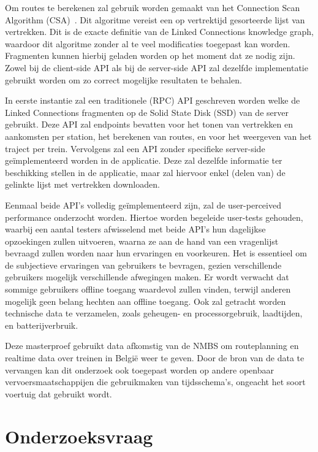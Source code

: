 Om routes te berekenen zal gebruik worden gemaakt van het Connection Scan Algorithm (CSA)~\citep{strasser13,strasser14,strasser17}. Dit algoritme vereist een op vertrektijd gesorteerde lijst van vertrekken. Dit is de exacte definitie van de Linked Connections knowledge graph, waardoor dit algoritme zonder al te veel modificaties toegepast kan worden. Fragmenten kunnen hierbij geladen worden op het moment dat ze nodig zijn. Zowel bij de client-side API als bij de server-side API zal dezelfde implementatie gebruikt worden om zo correct mogelijke resultaten te behalen. 

In eerste instantie zal een traditionele (RPC) API geschreven worden welke de Linked Connections fragmenten op de Solid State Disk (SSD) van de server gebruikt. Deze API zal endpoints bevatten voor het tonen van vertrekken en aankomsten per station, het berekenen van routes, en voor het weergeven van het traject per trein. 
Vervolgens zal een API zonder specifieke server-side geïmplementeerd worden in de applicatie. Deze zal dezelfde informatie ter beschikking stellen in de applicatie, maar zal hiervoor enkel (delen van) de gelinkte lijst met vertrekken downloaden. 

Eenmaal beide API's volledig geïmplementeerd zijn, zal de user-perceived performance onderzocht worden. Hiertoe worden begeleide user-tests gehouden, waarbij een aantal testers afwisselend met beide API's hun dagelijkse opzoekingen zullen uitvoeren, waarna ze aan de hand van een vragenlijst bevraagd zullen worden naar hun ervaringen en voorkeuren. Het is essentieel om de subjectieve ervaringen van gebruikers te bevragen, gezien verschillende gebruikers mogelijk verschillende afwegingen maken. Er wordt verwacht dat sommige gebruikers offline toegang waardevol zullen vinden, terwijl anderen mogelijk geen belang hechten aan offline toegang. Ook zal getracht worden technische data te verzamelen, zoals geheugen- en processorgebruik, laadtijden, en batterijverbruik. 

Deze masterproef gebruikt data afkomstig van de NMBS om routeplanning en realtime data over treinen in België weer te geven. Door de bron van de data te vervangen kan dit onderzoek ook toegepast worden op andere openbaar vervoersmaatschappijen die gebruikmaken van tijdsschema's, ongeacht het soort voertuig dat gebruikt wordt.

\section{Onderzoeksvraag}
\label{sec:onderzoeksvraag}
 
